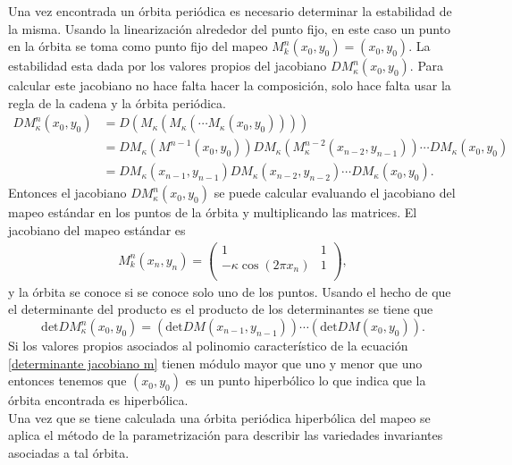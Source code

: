 Una vez encontrada un \'orbita peri\'odica es necesario determinar la estabilidad de la misma. Usando la linearizaci\'on alrededor del punto fijo, en este caso un punto en la \'orbita se toma como punto fijo  del mapeo  $M^{n}_{k}(x_{0},y_{0})=(x_{0},y_{0})$. La estabilidad esta dada por los valores propios del jacobiano $DM^{n}_{\kappa}(x_{0},y_{0})$. Para calcular este jacobiano no hace falta hacer la composici\'on, solo hace falta usar la regla de la cadena y la \'orbita peri\'odica.
\begin{align*}
DM^{n}_{\kappa}(x_{0},y_{0}) &= D(M_{\kappa}(M_{\kappa}(\cdots M_{\kappa}(x_{0},y_{0}))))\\
& = DM_{\kappa}(M^{n-1}(x_{0},y_{0}))DM_{\kappa}(M^{n-2}_{\kappa}(x_{n-2},y_{n-1}))\cdots DM_{\kappa}(x_{0},y_{0})\\
& = DM_{\kappa}(x_{n-1},y_{n-1})DM_{\kappa}(x_{n-2},y_{n-2})\cdots DM_{\kappa}(x_{0},y_{0}).
\end{align*}
Entonces el jacobiano $DM^{n}_{\kappa}(x_{0},y_{0})$ se puede calcular evaluando el jacobiano del mapeo est\'andar en los puntos de la \'orbita y multiplicando las matrices. El jacobiano del mapeo est\'andar es
\begin{eqnarray}
M^{n}_{k}(x_{n},y_{n})=\begin{pmatrix}
1 & 1 \\
- \kappa\cos(2\pi x_{n})& 1\\ 
\end{pmatrix},
\label{jacobiano mapeo}
\end{eqnarray}
y la \'orbita se conoce si se conoce solo uno de los puntos. Usando el hecho de que el determinante del producto es el producto de los determinantes se tiene que 
\begin{equation}
\textrm{det}DM^{n}_{\kappa}(x_{0},y_{0}) = \left(\textrm{det} DM(x_{n-1},y_{n-1})\right) \cdots \left(\textrm{det} DM(x_{0},y_{0})\right).
\label{determinante jacobiano m}
\end{equation} 
Si los valores propios asociados al polinomio caracter\'istico de la ecuaci\'on \eqref{determinante jacobiano m} tienen m\'odulo mayor que uno y menor que uno entonces tenemos que $(x_{0},y_{0})$ es un punto hiperb\'olico lo que indica que la \'orbita encontrada es hiperb\'olica. \\

Una vez que se tiene calculada una \'orbita peri\'odica hiperb\'olica del mapeo se aplica el m\'etodo de la parametrizaci\'on para describir las variedades invariantes asociadas a tal \'orbita. \\



